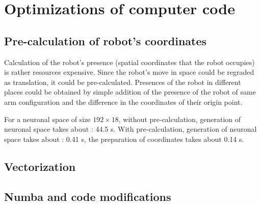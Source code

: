 \chapter{Optimizations of computer code}
\label{cha:optimizaiton}

\section{Pre-calculation of robot's coordinates}
\label{sec:optimizaiton_Precalculation}

Calculation of the robot's presence (spatial coordinates that the robot occupies) is rather resources expensive. 
Since the robot's move in space could be regraded as translation, it could be pre-calculated. 
Presences of the robot in different places could be obtained by simple addition of the presence of the robot of same arm configuration
and the difference in the coordinates of their origin point. 


For a neuronal space of size $ 192 \times 18 $,
without pre-calculation, generation of neuronal space takes about : 44.5 s.
With pre-calculation, generation of neuronal space takes about : 0.41 s, the preparation
of coordinates takes about 0.14 s.

\section{Vectorization}
\label{sec:optimizaiton_vectorization}

\section{Numba and code modifications}
\label{sec:optimizaiton_numba}